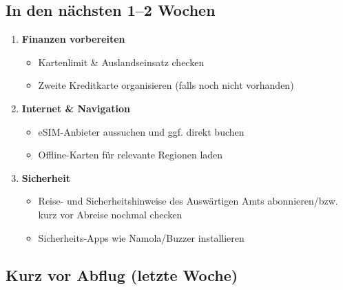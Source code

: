\documentclass[12pt,a4paper]{article}
\begin{document}
\subsection{In den nächsten 1–2 Wochen}

\begin{actionbox}[title={\faListUl \hspace{0.2cm} Mittlere Priorität}]

\begin{enumerate}[leftmargin=*,label={\color{accentorange}\bfseries\arabic*.}]
    \item \textbf{Finanzen vorbereiten}
    \begin{itemize}[label={\color{accentorange}\faChevronRight}]
        \item Kartenlimit \& Auslandseinsatz checken
        \item Zweite Kreditkarte organisieren (falls noch nicht vorhanden)
    \end{itemize}

    \item \textbf{Internet \& Navigation}
    \begin{itemize}[label={\color{accentorange}\faChevronRight}]
        \item eSIM-Anbieter aussuchen und ggf. direkt buchen\cite{airalo}
        \item Offline-Karten für relevante Regionen laden
    \end{itemize}

    \item \textbf{Sicherheit}
    \begin{itemize}[label={\color{accentorange}\faChevronRight}]
        \item Reise- und Sicherheitshinweise des Auswärtigen Amts abonnieren/bzw. kurz vor Abreise nochmal checken
        \item Sicherheits-Apps wie Namola/Buzzer installieren
    \end{itemize}
\end{enumerate}

\end{actionbox}

\newpage
\subsection{Kurz vor Abflug (letzte Woche)}
\end{document}
